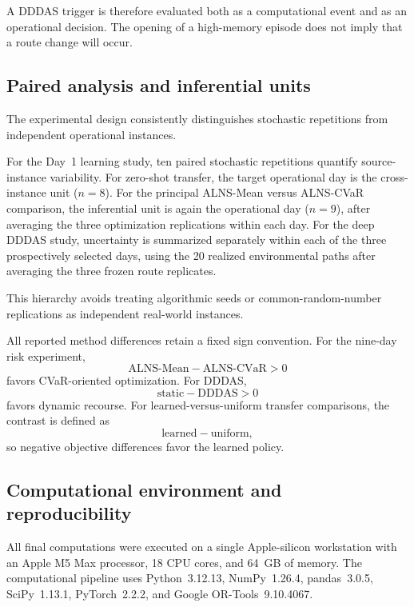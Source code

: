 \documentclass[preprint,12pt]{elsarticle}
\newcommand{\1}{\mathbf{1}}
\begin{document}
A DDDAS trigger is therefore evaluated both as a computational event and as an
operational decision. The opening of a high-memory episode does not imply that
a route change will occur.

\subsection{Paired analysis and inferential units}
\label{subsec:inference}

The experimental design consistently distinguishes stochastic repetitions from
independent operational instances.

For the Day~1 learning study, ten paired stochastic repetitions quantify
source-instance variability.
For zero-shot transfer, the target operational day is the cross-instance unit
($n=8$).
For the principal ALNS-Mean versus ALNS-CVaR comparison, the inferential unit is
again the operational day ($n=9$), after averaging the three optimization
replications within each day.
For the deep DDDAS study, uncertainty is summarized separately within each of
the three prospectively selected days, using the 20 realized environmental
paths after averaging the three frozen route replicates.

This hierarchy avoids treating algorithmic seeds or common-random-number
replications as independent real-world instances.

All reported method differences retain a fixed sign convention.
For the nine-day risk experiment,
\[
\text{ALNS-Mean}-\text{ALNS-CVaR}>0
\]
favors CVaR-oriented optimization.
For DDDAS,
\[
\text{static}-\text{DDDAS}>0
\]
favors dynamic recourse.
For learned-versus-uniform transfer comparisons, the contrast is defined as
\[
\text{learned}-\text{uniform},
\]
so negative objective differences favor the learned policy.

\subsection{Computational environment and reproducibility}
\label{subsec:computational_environment}

All final computations were executed on a single Apple-silicon workstation with
an Apple M5 Max processor, 18 CPU cores, and 64~GB of memory. The computational
pipeline uses Python~3.12.13, NumPy~1.26.4, pandas~3.0.5, SciPy~1.13.1,
PyTorch~2.2.2, and Google OR-Tools~9.10.4067.
\end{document}

